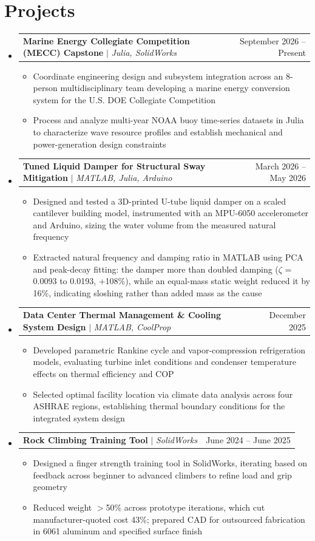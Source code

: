 \documentclass[letterpaper,11pt]{article}
\makeatletter
\newcommand{\resumeItem}[1]{
  \item\small{
    {#1 \vspace{-2pt}}
  }
}
\newcommand{\resumeProjectHeading}[2]{
    \item
    \begin{tabular*}{0.97\textwidth}{l@{\extracolsep{\fill}}r}
      \small#1 & #2 \\
    \end{tabular*}\vspace{-7pt}
}
\newcommand{\resumeSubHeadingListStart}{\begin{itemize}[leftmargin=0.15in, label={}]}
\newcommand{\resumeSubHeadingListEnd}{\end{itemize}}
\newcommand{\resumeItemListStart}{\begin{itemize}}
\newcommand{\resumeItemListEnd}{\end{itemize}\vspace{-5pt}}
\makeatother
\begin{document}
\section{Projects}
    \resumeSubHeadingListStart
    \resumeProjectHeading
          {\textbf{Marine Energy Collegiate Competition (MECC) Capstone} $|$ \emph{Julia, SolidWorks}}{September 2026 -- Present}
          \resumeItemListStart
            \resumeItem{Coordinate engineering design and subsystem integration across an 8-person multidisciplinary team developing a marine energy conversion system for the U.S. DOE Collegiate Competition}
            \resumeItem{Process and analyze multi-year NOAA buoy time-series datasets in Julia to characterize wave resource profiles and establish mechanical and power-generation design constraints}
          \resumeItemListEnd
      \resumeProjectHeading
          {\textbf{Tuned Liquid Damper for Structural Sway Mitigation} $|$ \emph{MATLAB, Julia, Arduino}}{March 2026 -- May 2026}
          \resumeItemListStart
            \resumeItem{Designed and tested a 3D-printed U-tube liquid damper on a scaled cantilever building model, instrumented with an MPU-6050 accelerometer and Arduino, sizing the water volume from the measured natural frequency}
            \resumeItem{Extracted natural frequency and damping ratio in MATLAB using PCA and peak-decay fitting: the damper more than doubled damping ($\zeta$ = 0.0093 to 0.0193, +108\%), while an equal-mass static weight reduced it by 16\%, indicating sloshing rather than added mass as the cause}
          \resumeItemListEnd
      \resumeProjectHeading
          {\textbf{Data Center Thermal Management \& Cooling System Design} $|$ \emph{MATLAB, CoolProp}}{December 2025}
          \resumeItemListStart
            \resumeItem{Developed parametric Rankine cycle and vapor-compression refrigeration models, evaluating turbine inlet conditions and condenser temperature effects on thermal efficiency and COP}
            \resumeItem{Selected optimal facility location via climate data analysis across four ASHRAE regions, establishing thermal boundary conditions for the integrated system design}
          \resumeItemListEnd
      \resumeProjectHeading
          {\textbf{Rock Climbing Training Tool} $|$ \emph{SolidWorks}}{June 2024 -- June 2025}
          \resumeItemListStart
            \resumeItem{Designed a finger strength training tool in SolidWorks, iterating based on feedback across beginner to advanced climbers to refine load and grip geometry}
            \resumeItem{Reduced weight $>$50\% across prototype iterations, which cut manufacturer-quoted cost 43\%; prepared CAD for outsourced fabrication in 6061 aluminum and specified surface finish}
          \resumeItemListEnd
    \resumeSubHeadingListEnd
\end{document}
